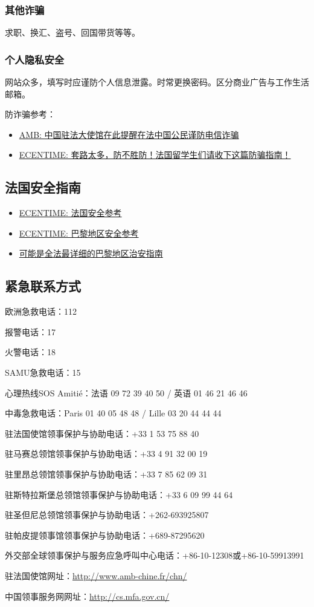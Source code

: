 \subsubsection{其他诈骗}
求职、换汇、盗号、回国带货等等。

\subsubsection{个人隐私安全}
网站众多，填写时应谨防个人信息泄露。时常更换密码。区分商业广告与工作生活邮箱。

防诈骗参考：
\begin{itemize}
    \item \href{http://www.amb-chine.fr/chn/sgxw/t1823322.htm}{AMB: 中国驻法大使馆在此提醒在法中国公民谨防电信诈骗}
    \item \href{https://www.ecentime.com/article/bien-vivre-en-france}{ECENTIME: 套路太多，防不胜防！法国留学生们请收下这篇防骗指南！}
\end{itemize}

\subsection{法国安全指南}
\begin{itemize}
    \item \href{https://www.ecentime.com/article/security-guide-in-france}{ECENTIME: 法国安全参考}
    \item 
    \href{https://www.ecentime.com/article/securite-arrondissement}{ECENTIME: 巴黎地区安全参考}
    \item \href{https://mp.weixin.qq.com/s/EOGbefPAPmCXaiPJtq32Gw}{可能是全法最详细的巴黎地区治安指南}
\end{itemize}

\subsection{紧急联系方式}

欧洲急救电话：112

报警电话：17 

火警电话：18 

SAMU急救电话：15 

心理热线SOS Amitié：法语 09 72 39 40 50 / 英语 01 46 21 46 46

中毒急救电话：Paris 01 40 05 48 48 / Lille 03 20 44 44 44

驻法国使馆领事保护与协助电话：+33 1 53 75 88 40

驻马赛总领馆领事保护与协助电话：+33 4 91 32 00 19

驻里昂总领馆领事保护与协助电话：+33 7 85 62 09 31

驻斯特拉斯堡总领馆领事保护与协助电话：+33 6 09 99 44 64

驻圣但尼总领馆领事保护与协助电话：+262-693925807

驻帕皮提领事馆领事保护与协助电话：+689-87295620

外交部全球领事保护与服务应急呼叫中心电话：+86-10-12308或+86-10-59913991

驻法国使馆网址：\href{http://www.amb-chine.fr/chn/}{http://www.amb-chine.fr/chn/} 

中国领事服务网网址：\href{http://cs.mfa.gov.cn/}{http://cs.mfa.gov.cn/} 
